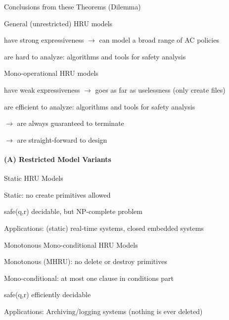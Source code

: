 \documentclass[a4paper]{article}
\begin{document}
\begin{multicols}{3}
    Conclusions from these Theorems (Dilemma)
    \begin{itemize*}
        \item General (unrestricted) HRU models
        \begin{itemize*}
            \item have strong expressiveness $\rightarrow$ can model a broad range of AC policies
            \item are hard to analyze: algorithms and tools for safety analysis
        \end{itemize*}
        \item Mono-operational HRU models
        \begin{itemize*}
            \item have weak expressiveness $\rightarrow$ goes as far as uselessness (only create files)
            \item are efficient to analyze: algorithms and tools for safety analysis
            \item[$\rightarrow$] are always guaranteed to terminate
            \item[$\rightarrow$] are straight-forward to design
        \end{itemize*}
    \end{itemize*}

    \paragraph{(A) Restricted Model Variants}

    Static HRU Models
    \begin{itemize*}
        \item Static: no create primitives allowed
        \item safe(q,r) decidable, but NP-complete problem
        \item Applications: (static) real-time systems, closed embedded systems
    \end{itemize*}

    Monotonous Mono-conditional HRU Models
    \begin{itemize*}
        \item Monotonous (MHRU): no delete or destroy primitives
        \item Mono-conditional: at most one clause in conditions part
        \item safe(q,r) efficiently decidable
        \item Applications: Archiving/logging systems (nothing is ever deleted)
    \end{itemize*}


\end{multicols}
\end{document}
